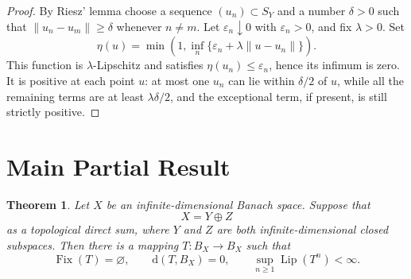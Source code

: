 \documentclass[11pt]{article}
\newtheorem{theorem}{Theorem}
\newcommand{\Fix}{\operatorname{Fix}}
\newcommand{\Lip}{\operatorname{Lip}}
\begin{document}
\begin{proof}
By Riesz' lemma choose a sequence \((u_n)\subset S_Y\) and a number
\(\delta>0\) such that \(\|u_n-u_m\|\ge\delta\) whenever \(n\ne m\).  Let
\(\varepsilon_n\downarrow0\) with \(\varepsilon_n>0\), and fix
\(\lambda>0\).  Set
\[
\eta(u)=\min\left(1,\inf_n\{\varepsilon_n+\lambda\|u-u_n\|\}\right).
\]
This function is \(\lambda\)-Lipschitz and satisfies
\(\eta(u_n)\le\varepsilon_n\), hence its infimum is zero.  It is positive at
each point \(u\): at most one \(u_n\) can lie within \(\delta/2\) of \(u\),
while all the remaining terms are at least \(\lambda\delta/2\), and the
exceptional term, if present, is still strictly positive.
\end{proof}

\section*{Main Partial Result}

\begin{theorem}
Let \(X\) be an infinite-dimensional Banach space.  Suppose that
\[
X=Y\oplus Z
\]
as a topological direct sum, where \(Y\) and \(Z\) are both
infinite-dimensional closed subspaces.  Then there is a mapping
\(T:B_X\to B_X\) such that
\[
\Fix(T)=\varnothing,\qquad
\mathrm d(T,B_X)=0,\qquad
\sup_{n\ge1}\Lip(T^n)<\infty .
\]
\end{theorem}
\end{document}

